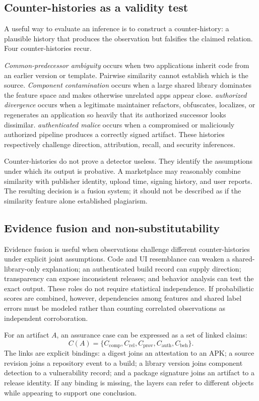 \subsection{Counter-histories as a validity test}

A useful way to evaluate an inference is to construct a counter-history: a plausible history that produces the observation but falsifies the claimed relation. Four counter-histories recur.

\emph{Common-predecessor ambiguity} occurs when two applications inherit code from an earlier version or template. Pairwise similarity cannot establish which is the source. \emph{Component contamination} occurs when a large shared library dominates the feature space and makes otherwise unrelated apps appear close. \emph{authorized divergence} occurs when a legitimate maintainer refactors, obfuscates, localizes, or regenerates an application so heavily that its authorized successor looks dissimilar. \emph{authenticated malice} occurs when a compromised or maliciously authorized pipeline produces a correctly signed artifact. These histories respectively challenge direction, attribution, recall, and security inferences.

Counter-histories do not prove a detector useless. They identify the assumptions under which its output is probative. A marketplace may reasonably combine similarity with publisher identity, upload time, signing history, and user reports. The resulting decision is a fusion system; it should not be described as if the similarity feature alone established plagiarism.

\subsection{Evidence fusion and non-substitutability}

Evidence fusion is useful when observations challenge different counter-histories under explicit joint assumptions. Code and UI resemblance can weaken a shared-library-only explanation; an authenticated build record can supply direction; transparency can expose inconsistent releases; and behavior analysis can test the exact output. These roles do not require statistical independence. If probabilistic scores are combined, however, dependencies among features and shared label errors must be modeled rather than counting correlated observations as independent corroboration.

For an artifact $A$, an assurance case can be expressed as a set of linked claims:
\[
 C(A)=\{C_{\mathrm{comp}},C_{\mathrm{rel}},C_{\mathrm{prov}},C_{\mathrm{auth}},C_{\mathrm{beh}}\}.
\]
The links are explicit bindings: a digest joins an attestation to an APK; a source revision joins a repository event to a build; a library version joins component detection to a vulnerability record; and a package signature joins an artifact to a release identity. If any binding is missing, the layers can refer to different objects while appearing to support one conclusion.

